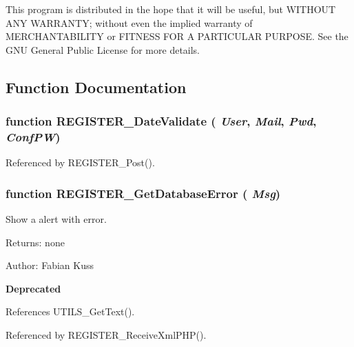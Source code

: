 This program is distributed in the hope that it will be useful, but WITHOUT ANY WARRANTY; without even the implied warranty of MERCHANTABILITY or FITNESS FOR A PARTICULAR PURPOSE. See the GNU General Public License for more details. 

\subsection{Function Documentation}
\subsubsection[REGISTER\_\-DateValidate]{\setlength{\rightskip}{0pt plus 5cm}function REGISTER\_\-DateValidate ( {\em User}, \/   {\em Mail}, \/   {\em Pwd}, \/   {\em ConfPW})}\label{register_8js_d13d62f6d4bc07251fde3160659eea8f}




Referenced by REGISTER\_\-Post().
\subsubsection[REGISTER\_\-GetDatabaseError]{\setlength{\rightskip}{0pt plus 5cm}function REGISTER\_\-GetDatabaseError ( {\em Msg})}\label{register_8js_6f672d4c31ec61239d0c447e2d909d45}


Show a alert with error. 

\begin{Desc}
\item[Returns:]none \end{Desc}
\begin{Desc}
\item[Author:]Fabian Kuss \end{Desc}
\begin{Desc}
\item[{\bf Deprecated}]\end{Desc}


References UTILS\_\-GetText().

Referenced by REGISTER\_\-ReceiveXmlPHP().

